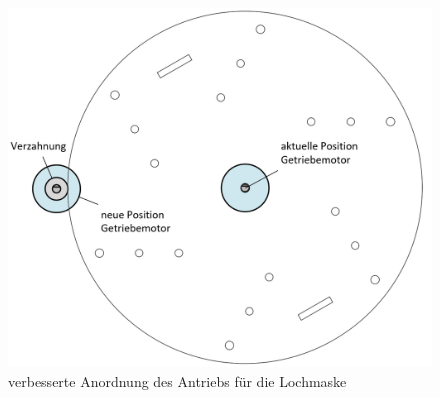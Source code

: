 \begin{figure}[H]
	\includegraphics[scale=0.5]{Illustrationen/8-Fazit/optimierung_lochmaske.png}
	\caption{verbesserte Anordnung des Antriebs für die Lochmaske}
	\label{fig:optimierung_lochmaske}
\end{figure}